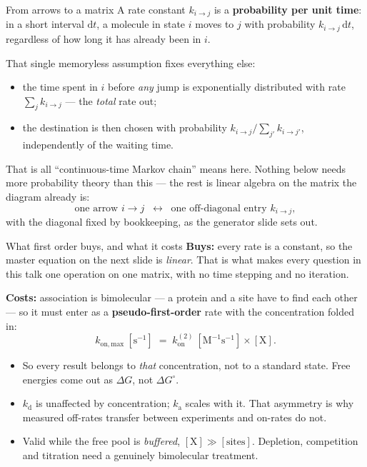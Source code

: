 \documentclass[10pt,aspectratio=169]{beamer}
\begin{document}
\begin{frame}{From arrows to a matrix}
  A rate constant $k_{i\to j}$ is a \textbf{probability per unit time}: in a
  short interval $\mathrm{d}t$, a molecule in state $i$ moves to $j$ with
  probability $k_{i\to j}\,\mathrm{d}t$, regardless of how long it has
  already been in $i$.

  That single memoryless assumption fixes everything else:
  \begin{itemize}
    \item the time spent in $i$ before \emph{any} jump is exponentially
      distributed with rate $\sum_j k_{i\to j}$ --- the \emph{total} rate
      out;
    \item the destination is then chosen with probability
      $k_{i\to j}\big/\sum_{j'} k_{i\to j'}$, independently of the waiting
      time.
  \end{itemize}
  That is all ``continuous-time Markov chain'' means here. Nothing below
  needs more probability theory than this --- the rest is linear algebra on
  the matrix the diagram already is:
  \[
    \text{one arrow } i\to j
    \;\;\longleftrightarrow\;\;
    \text{one off-diagonal entry } k_{i\to j},
  \]
  with the diagonal fixed by bookkeeping, as the generator slide sets out.
\end{frame}

\begin{frame}{What first order buys, and what it costs}
  \textbf{Buys:} every rate is a constant, so the master equation on the
  next slide is \emph{linear}. That is what makes every question in this
  talk one operation on one matrix, with no time stepping and no iteration.

  \smallskip
  \textbf{Costs:} association is bimolecular --- a protein and a site have
  to find each other --- so it must enter as a \textbf{pseudo-first-order}
  rate with the concentration folded in:
  \[
    k_{\mathrm{on,max}}\ [\mathrm{s^{-1}}]
      \;=\; k^{(2)}_{\mathrm{on}}\ [\mathrm{M^{-1}s^{-1}}]
      \times [\mathrm{X}] .
  \]
  \begin{itemize}
    \item So every result belongs to \emph{that} concentration, not to a
      standard state. Free energies come out as $\Delta G$, not
      $\Delta G^\circ$.
    \item $k_{\mathrm{d}}$ is unaffected by concentration; $k_{\mathrm{a}}$
      scales with it. That asymmetry is why measured off-rates transfer
      between experiments and on-rates do not.
    \item Valid while the free pool is \emph{buffered},
      $[\mathrm{X}]\gg[\text{sites}]$. Depletion, competition and titration
      need a genuinely bimolecular treatment.
  \end{itemize}
\end{frame}
\end{document}

